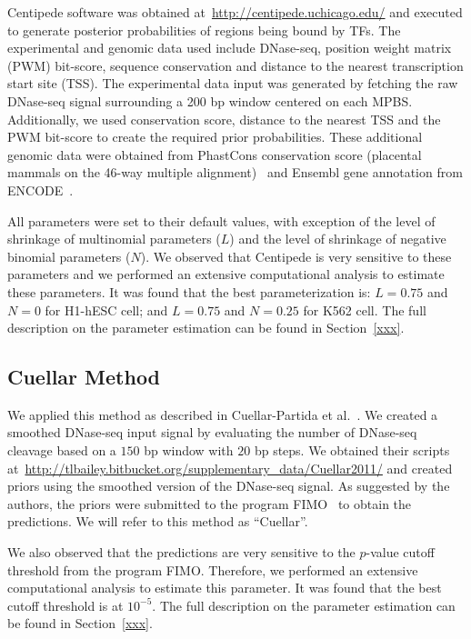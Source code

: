Centipede software was obtained at~\url{http://centipede.uchicago.edu/} and executed to generate posterior probabilities of regions being bound by TFs. The experimental and genomic data used include DNase-seq, position weight matrix (PWM) bit-score, sequence conservation and distance to the nearest transcription start site (TSS). The experimental data input was generated by fetching the raw DNase-seq signal surrounding a 200 bp window centered on each MPBS. Additionally, we used conservation score, distance to the nearest TSS and the PWM bit-score to create the required prior probabilities. These additional genomic data were obtained from PhastCons conservation score (placental mammals on the 46-way multiple alignment)~\cite{siepel2005} and Ensembl gene annotation from ENCODE~\cite{hubbard2002}.

All parameters were set to their default values, with exception of the level of shrinkage of multinomial parameters ($L$) and the level of shrinkage of negative binomial parameters ($N$). We observed that Centipede is very sensitive to these parameters and we performed an extensive computational analysis to estimate these parameters. It was found that the best parameterization is: $L=0.75$ and $N=0$ for H1-hESC cell; and $L=0.75$ and $N=0.25$ for K562 cell. The full description on the parameter estimation can be found in Section~\ref{xxx}.

\subsection{Cuellar Method}
\label{sec:cuellar}

We applied this method as described in Cuellar-Partida et al.~\cite{cuellar2012}. We created a smoothed DNase-seq input signal by evaluating the number of DNase-seq cleavage based on a $150$ bp window with $20$ bp steps. We obtained their scripts at~\url{http://tlbailey.bitbucket.org/supplementary_data/Cuellar2011/} and created priors using the smoothed version of the DNase-seq signal. As suggested by the authors, the priors were submitted to the program FIMO~\cite{grant2011} to obtain the predictions. We will refer to this method as ``Cuellar''.

We also observed that the predictions are very sensitive to the $p$-value cutoff threshold from the program FIMO. Therefore, we performed an extensive computational analysis to estimate this parameter. It was found that the best cutoff threshold is at $10^{-5}$. The full description on the parameter estimation can be found in Section~\ref{xxx}.


